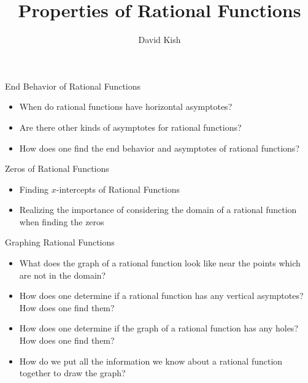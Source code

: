 \documentclass{ximera}
\author{David Kish}
\title{Properties of Rational Functions}
\begin{document}
\begin{abstract}
\end{abstract}
\maketitle


\begin{objectives}

\item End Behavior of Rational Functions
\begin{itemize}
	\item When do rational functions have horizontal asymptotes?
	\item Are there other kinds of asymptotes for rational functions?
	\item How does one find the end behavior and asymptotes of rational functions?
\end{itemize}

\item Zeros of Rational Functions
\begin{itemize}
\item Finding $x$-intercepts of Rational Functions
\item Realizing the importance of considering the domain of a rational function when finding the zeros
\end{itemize}


\item Graphing Rational Functions
\begin{itemize}
	\item What does the graph of a rational function look like near the points which are not in the domain?
	\item How does one determine if a rational function has any vertical asymptotes?  How does one find them?
	\item How does one determine if the graph of a rational function has any holes?  How does one find them?
	\item How do we put all the information we know about a rational function together to draw the graph?
\end{itemize}


\end{objectives}
\end{document}
